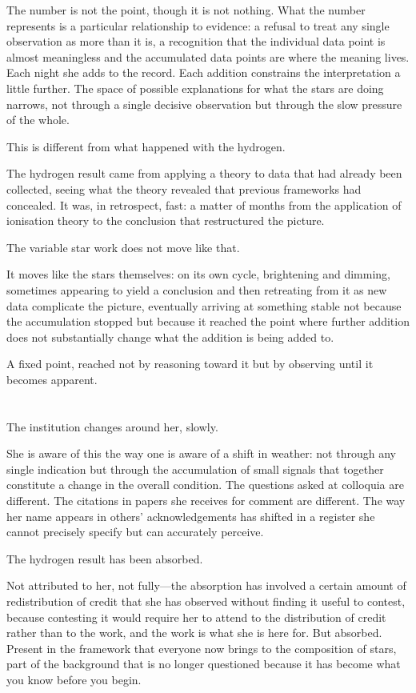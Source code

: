 The number is not the point, though it is not nothing.
What the number represents is a particular relationship
to evidence: a refusal to treat any single observation
as more than it is, a recognition that the individual
data point is almost meaningless and the accumulated
data points are where the meaning lives. Each night
she adds to the record. Each addition constrains the
interpretation a little further. The space of possible
explanations for what the stars are doing narrows,
not through a single decisive observation but through
the slow pressure of the whole.

This is different from what happened with the hydrogen.

The hydrogen result came from applying a theory to
data that had already been collected, seeing what
the theory revealed that previous frameworks had
concealed. It was, in retrospect, fast: a matter
of months from the application of ionisation theory
to the conclusion that restructured the picture.

The variable star work does not move like that.

It moves like the stars themselves: on its own
cycle, brightening and dimming, sometimes appearing
to yield a conclusion and then retreating from it
as new data complicate the picture, eventually
arriving at something stable not because the
accumulation stopped but because it reached the
point where further addition does not substantially
change what the addition is being added to.

A fixed point, reached not by reasoning toward
it but by observing until it becomes apparent.

\section{}

The institution changes around her, slowly.

She is aware of this the way one is aware of
a shift in weather: not through any single
indication but through the accumulation of
small signals that together constitute a
change in the overall condition. The questions
asked at colloquia are different. The citations
in papers she receives for comment are different.
The way her name appears in others' acknowledgements
has shifted in a register she cannot precisely
specify but can accurately perceive.

The hydrogen result has been absorbed.

Not attributed to her, not fully---the absorption
has involved a certain amount of redistribution
of credit that she has observed without finding
it useful to contest, because contesting it would
require her to attend to the distribution of credit
rather than to the work, and the work is what she
is here for. But absorbed. Present in the framework
that everyone now brings to the composition of
stars, part of the background that is no longer
questioned because it has become what you know
before you begin.

